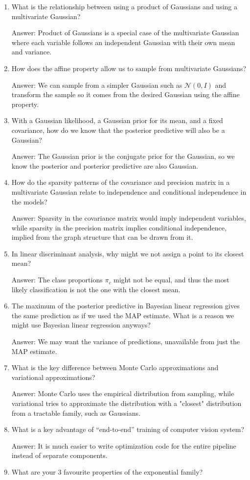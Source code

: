 \documentclass{article}
\def\ans#1{\par\gre{Answer: #1}}
\def\gre#1{{\color{gre}#1}}
\def\enum#1{\begin{enumerate}#1\end{enumerate}}
\begin{document}
\enum{
\item What is the relationship between using a product of Gaussians and using a multivariate Gaussian?
\ans{
Product of Gaussians is a special case of the multivariate Gaussian where each variable follows an independent Gaussian with their own mean and variance.
}
\item How does the affine property allow us to sample from multivariate Gaussians?
\ans{
We can sample from a simpler Gaussian such as $\mathcal{N}(0,I)$ and transform the sample so it comes from the desired Gaussian using the affine property.
}
\item With a Gaussian likelihood, a Gaussian prior for its mean, and a fixed covariance, how do we know that the posterior predictive will also be a Gaussian?
\ans{
The Gaussian prior is the conjugate prior for the Gaussian, so we know the posterior and posterior predictive are also Gaussian.
}
\item How do the sparsity patterns of the covariance and precision matrix in a multivariate Gaussian relate to independence and conditional independence in the models?
\ans{
Sparsity in the covariance matrix would imply independent variables, while sparsity in the precision matrix implies conditional independence, implied from the graph structure that can be drawn from it.
}
\item In linear discriminant analysis, why might we not assign a point to its closest mean?
\ans{
The class proportions $\pi_c$ might not be equal, and thus the most likely classification is not the one with the closest mean.
}
\pagebreak
\item The maximum of the posterior predictive in Bayesian linear regression gives the same prediction as if we used the MAP estimate. What is a reason we might use Bayesian linear regression anyways?
\ans{
We may want the variance of predictions, unavailable from just the MAP estimate.
}
\item What is the key difference between Monte Carlo approximations and variational approximations?
\ans{
Monte Carlo uses the empirical distribution from sampling, while variational tries to approximate the distribution with a "closest" distribution from a tractable family, such as Gaussians.
}
\item What is a key advantage of ``end-to-end'' training of computer vision system?
\ans{
It is much easier to write optimization code for the entire pipeline instead of separate components.
}
\item What are your 3 favourite properties of the exponential family?
}
\end{document}
